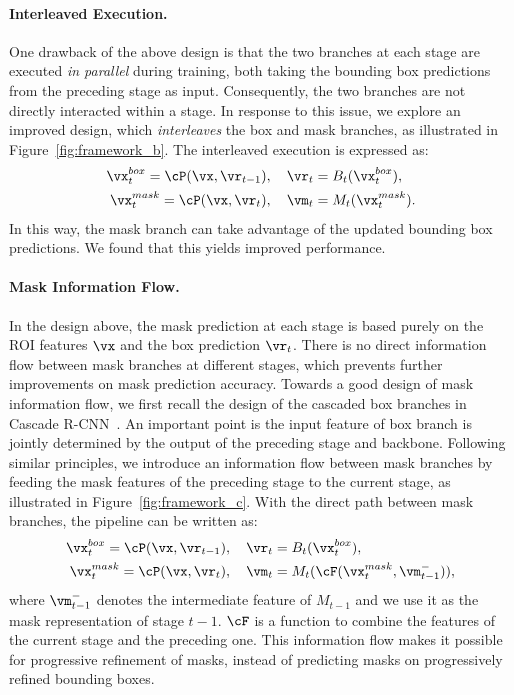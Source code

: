 \documentclass[10pt,twocolumn,letterpaper]{article}
\begin{document}
\paragraph{Interleaved Execution.}
One drawback of the above design is that the two branches at each stage
are executed \emph{in parallel} during training, both taking the bounding box predictions
from the preceding stage as input. Consequently, the two branches are not
directly interacted within a stage.
In response to this issue, we explore an improved design, which
\emph{interleaves} the box and mask branches, as illustrated in
Figure~\ref{fig:framework_b}.
The interleaved execution is expressed as:
\begin{equation}
	\label{equ:framework_b}
	\begin{split}
		\vx_t^{box} = \cP(\vx, \vr_{t-1})&,  \quad \vr_t = B_t(\vx_t^{box}), \\
		\vx_t^{mask} = \cP(\vx, \vr_t)&,  \quad \vm_t = M_t(\vx_t^{mask}).
	\end{split}
\end{equation}
In this way, the mask branch can take advantage of the updated
bounding box predictions. We found that this yields improved performance.

\vspace{-7pt}
\paragraph{Mask Information Flow.}
In the design above, the mask prediction at each stage is based purely on
the ROI features $\vx$ and the box prediction $\vr_t$. There is no
direct information flow between mask branches at different stages,
which prevents further improvements on mask prediction accuracy.
Towards a good design of mask information flow, we first recall the design of
the cascaded box branches in Cascade R-CNN~\cite{cai18cascadercnn}.
An important point is the input feature of box branch is jointly determined by
the output of the preceding stage and backbone.
Following similar principles, we introduce an information flow between mask
branches by feeding the mask features of the preceding stage to the current stage,
as illustrated in Figure~\ref{fig:framework_c}.
With the direct path between mask branches, the pipeline can be written as:
\begin{equation}
	\label{equ:framework_c}
	\begin{split}
		\vx_t^{box} = \cP(\vx, \vr_{t-1})&, \quad \vr_t = B_t(\vx_t^{box}), \\
		\vx_t^{mask} = \cP(\vx, \vr_t)&, \quad \vm_t = M_t(\cF(\vx_t^{mask},\vm^-_{t-1})),
	\end{split}
\end{equation}
where $\vm^-_{t-1}$ denotes the intermediate feature of $M_{t-1}$ and we use it as
the mask representation of stage $t-1$.
$\cF$ is a function to combine the features of the current stage and the preceding one.
This information flow makes it possible for progressive refinement of masks,
instead of predicting masks on progressively refined bounding boxes.
\end{document}
